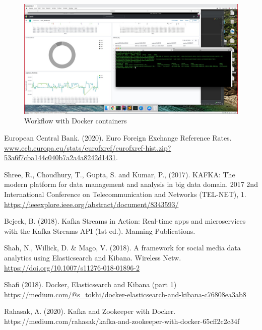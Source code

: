 \documentclass{article}
\begin{document}
\begin{figure}[h!]
\centering
\includegraphics[width=\textwidth]{Docker_snapshot.jpg}
\caption{Workflow with Docker containers}
\label{fig:OuptutDashboard}
\end{figure}


\newpage
\begin{thebibliography}{9}

European Central Bank. (2020). Euro Foreign Exchange Reference Rates. \url{www.ecb.europa.eu/stats/eurofxref/eurofxref-hist.zip?53a6f7cba144c040b7a2a4a8242d1431}.

Shree, R., Choudhury, T., Gupta, S. and Kumar, P., (2017). KAFKA: The modern platform for data management and analysis in big data domain. 2017 2nd International Conference on Telecommunication and Networks (TEL-NET), 1. \url{https://ieeexplore.ieee.org/abstract/document/8343593/}

Bejeck, B. (2018). Kafka Streams in Action: Real-time apps and microservices with the Kafka Streams API (1st ed.). Manning Publications.

Shah, N., Willick, D. & Mago, V. (2018). A framework for social media data analytics using Elasticsearch and Kibana. Wireless Netw. \url{https://doi.org/10.1007/s11276-018-01896-2}

Shafi (2018). Docker, Elasticsearch and Kibana (part 1) \url{https://medium.com/@s\_tokhi/docker-elasticsearch-and-kibana-c76808ea3ab8}

Rahasak, Λ. (2020). Kafka and Zookeeper with Docker. https://medium.com/rahasak/kafka-and-zookeeper-with-docker-65cff2c2c34f

\end{thebibliography}
\end{document}
